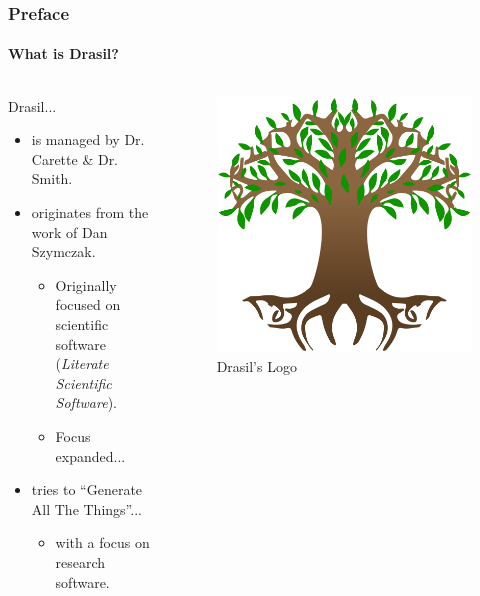 \documentclass{beamer}
\begin{document}
\begin{frame}
    \frametitle{Preface}
    \framesubtitle{What is Drasil?}
    \begin{columns}[T,onlytextwidth]
        \begin{column}{.5\textwidth}
            Drasil...
            \newline \newline
            \begin{minipage}{\textwidth}
                \begin{itemize}
                    \item<1-> is managed by Dr. Carette \& Dr. Smith.
                    \item<2-> originates from the work of Dan Szymczak.
                        \begin{itemize}
                            \item<3-> Originally focused on scientific software (\emph{Literate Scientific Software}).
                            \item<4-> Focus expanded...
                        \end{itemize}
                    \item<5-> tries to ``Generate All The Things''...
                    \begin{itemize}
                        \item<6-> with a focus on research software.
                    \end{itemize}
                \end{itemize}
            \end{minipage}
        \end{column}
        \begin{column}{.45\textwidth}
            \begin{figure}
                \includegraphics[width=.8\textwidth]{assets/drasil-logo.png}
                \caption{Drasil's Logo \tiny\cite{Drasil2021}\cite{YggdrasilWiki2021}}
            \end{figure}
        \end{column}
    \end{columns}
\end{frame}
\end{document}
